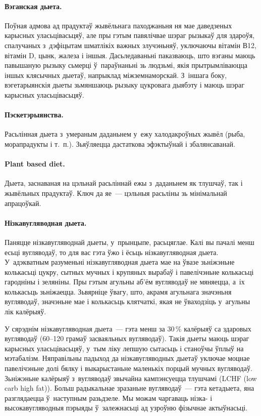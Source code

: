 \paragraph{Вэганская дыета.}
Поўная адмова ад прадуктаў жывёльнага паходжаньня ня мае даведзеных карысных уласьцівасьцяў, але пры гэтым павялічвае шэраг рызыкаў для здароўя, спалучаных з~дэфіцытам шматлікіх важных злучэньняў, уключаючы вітамін В12, вітамін D, цынк, жалеза і іншыя. Дасьледаваньні паказваюць, што вэганы маюць павышаную рызыку сьмерці ў~параўнаньні зь людзьмі, якія прытрымліваюцца іншых клясычных дыетаў, напрыклад міжземнаморскай. З~іншага боку, вэгетарыянскія дыеты зьмяншаюць рызыку цукровага дыябэту і маюць шэраг карысных уласьцівасьцяў.


\paragraph{Пэскетэрыянства.}
Расьлінная дыета з~умераным даданьнем у~ежу халодакроўных жывёл (рыба, морапрадукты і т.~п.). Зьяўляецца дастаткова эфэктыўнай і збалянсаванай.

\paragraph{Plant based diet.}
Дыета, заснаваная на цэльнай расьліннай ежы з~даданьнем як тлушчаў, так і жывёльных прадуктаў. Ключ да яе~--- цэльныя расьліны зь мінімальнай апрацоўкай.

\paragraph{Нізкавугляводная дыета.}
Паняцце нізкавугляводнай дыеты, у~прынцыпе, расьцяглае. Калі вы пачалі менш есьці вугляводаў, то для вас гэта ўжо і ёсьць нізкавугляводная дыета. У~адэкватным разуменьні нізкавугляводная дыета мае на ўвазе зьніжэньне колькасьці цукру, сытных мучных і крупяных вырабаў і павелічэньне колькасьці гародніны і зеляніны. Пры гэтым агульны аб'ём вугляводаў не мяняецца, а~іх колькасьць зьніжаецца. Зьвярніце ўвагу, што, акрамя агульнага значэньня вугляводаў, значэньне мае і колькасьць клятчаткі, якая не ўваходзіць у~агульны лік калёрыяў.

У сярэднім нізкавугляводная дыета~--- гэта менш за 30\,\% калёрыяў са здаровых вугляводаў (60--120 грамаў засваяльных вугляводаў). Такія дыеты маюць шэраг карысных уласьцівасьцяў, у~тым ліку лепшую сытасьць і станоўчы ўплыў на мэтабалізм. Няправільны падыход да нізкавугляводных дыетаў уключае моцнае павелічэньне долі бялку і выкарыстаньне маленькіх порцый мучных вугляводаў. Зьніжэньне калёрыяў з~вугляводаў звычайна кампэнсуецца тлушчамі (LCHF (low carb high fat)). Больш радыкальнае зразаньне вугляводаў~--- гэта кетадыета, яна разглядаецца ў~наступным разьдзеле. Мы можам чаргаваць нізка- і высокавугляводныя пэрыяды ў~залежнасьці ад узроўню фізычнае актыўнасьці.
